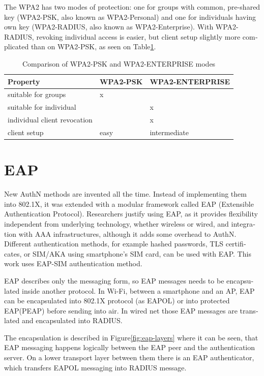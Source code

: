 \documentclass[12pt,a4paper,english]{tutthesis}
\begin{document}
\begin{otherlanguage}{english}
The WPA2 has two modes of protection: one for groups with common, pre-shared
key (WPA2-PSK, also known as WPA2-Personal) and one for individuals
having own key (WPA2-RADIUS, also known as  WPA2-Enterprise).  With
WPA2-RADIUS, revoking
individual access is easier, but client setup slightly more
complicated than on WPA2-PSK, as seen on Table\ref{psk-enterprise}.

\begin{table}[htb]
\caption{\label{psk-enterprise}Comparison of WPA2-PSK and WPA2-ENTERPRISE modes}
\centering
\begin{tabular}{l|l|l}
Property & WPA2-PSK & WPA2-ENTERPRISE\\
\hline
suitable for groups & x & \\
suitable for individual &  & x\\
individual client revocation &  & x\\
client setup & easy & intermediate\\
\hline
\end{tabular}
\end{table}


\section{EAP}
\label{sec-2-4}

New AuthN methods are invented all the time.
Instead of implementing them into 802.1X, it was 
extended with a modular framework called 
 EAP (Extensible Authentication Protocol)\cite{rfc5247}. 
Researchers justify using EAP, as it
provides flexibility independent from underlying technology, whether
wireless or wired,  and integration with AAA infrastructures, although
it adds some overhead to AuthN\cite{pereniguez10}.
Different authentication methods, for example hashed passwords, TLS
 certificates, or SIM/AKA using smartphone's SIM card,  can
be used with EAP.
This work uses EAP-SIM authentication method.


EAP describes only the messaging form, so EAP messages needs to
be encapsulated inside another protocol.  In Wi-Fi, between a smartphone
and an AP, EAP can be encapsulated into 802.1X protocol (as EAPOL) or
into protected EAP(PEAP)\cite{peap} before sending
into air. In wired net those EAP messages are translated and encapsulated into RADIUS.

The encapsulation is described in Figure\ref{fig:eap-layers} where it can be
seen, that EAP messaging happens logically between the EAP peer and
the authentication server. On a lower transport layer between them
there is an EAP authenticator, which transfers EAPOL messaging into
RADIUS message.


\end{otherlanguage}
\end{document}
